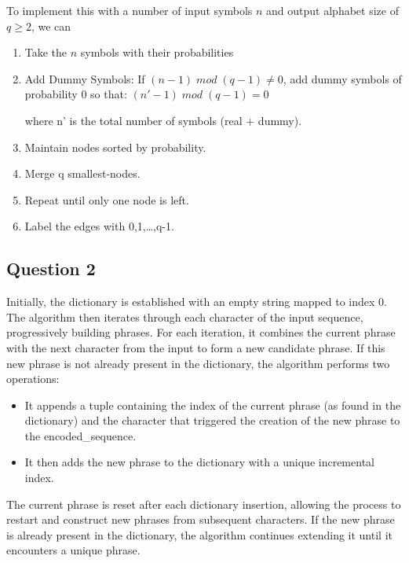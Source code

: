 \documentclass[]{template}
\begin{document}
        \noindent
        To implement this with a number of input symbols $n$ and output alphabet size of $q \geq 2$, we can
        
        \begin{enumerate}
            \item Take the $n$ symbols with their probabilities
            \item Add Dummy Symbols: If $(n-1) \; mod \; (q-1) \neq  0$, add dummy symbols of probability 0 so that:
            $(n' - 1) \; mod \; (q-1)=0$
            
            where n' is the total number of symbols (real + dummy).
            \item Maintain nodes sorted by probability.  
            \item Merge q smallest-nodes.
            \item Repeat until only one node is left.
            \item Label the edges with 0,1,\ldots,q-1.
        \end{enumerate}
        
    \subsection{Question 2}

    Initially, the dictionary is established with an empty string mapped to index 0. 
    The algorithm then iterates through each character of the input sequence, progressively building phrases.
    For each iteration, it combines the current phrase with the next character from the input to form 
    a new candidate phrase. 
    If this new phrase is not already present in the dictionary, the algorithm performs two operations:

    \begin{itemize}
        \item It appends a tuple containing the index of the current phrase (as found in the dictionary) 
            and the character that triggered the creation of the new phrase to the encoded\_sequence.
        \item It then adds the new phrase to the dictionary with a unique incremental index.
    \end{itemize}

    \noindent
    The current phrase is reset after each dictionary insertion, allowing the process to restart and 
    construct new phrases from subsequent characters. If the new phrase is already present in the dictionary,
    the algorithm continues extending it until it encounters a unique phrase.\\
\end{document}
